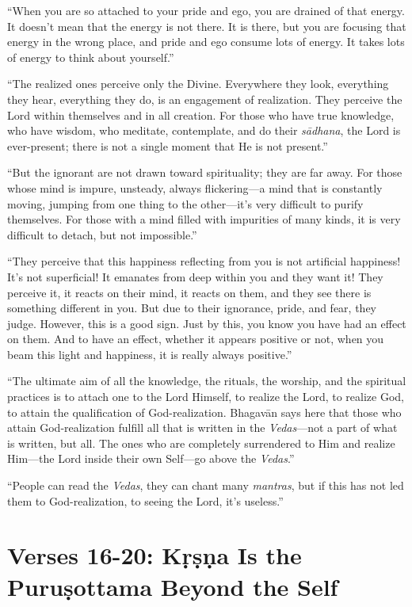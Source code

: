 \documentclass[12pt, twoside, openright]{memoir}
\begin{document}
\enquote{When you are so attached to your pride and ego, you are drained of that energy. It doesn’t mean that the energy is not there. It is there, but you are focusing that energy in the wrong place, and pride and ego consume lots of energy. It takes lots of energy to think about yourself.}

\enquote{The realized ones perceive only the Divine. Everywhere they look, everything they hear, everything they do, is an engagement of realization. They perceive the Lord within themselves and in all creation. For those who have true knowledge, who have wisdom, who meditate, contemplate, and do their \textit{sādhana}, the Lord is ever-present; there is not a single moment that He is not present.}

\enquote{But the ignorant are not drawn toward spirituality; they are far away. For those whose mind is impure, unsteady, always flickering---a mind that is constantly moving, jumping from one thing to the other---it’s very difficult to purify themselves. For those with a mind filled with impurities of many kinds, it is very difficult to detach, but not impossible.}

\enquote{They perceive that this happiness reflecting from you is not artificial happiness! It’s not superficial! It emanates from deep within you and they want it! They perceive it, it reacts on their mind, it reacts on them, and they see there is something different in you. But due to their ignorance, pride, and fear, they judge. However, this is a good sign. Just by this, you know you have had an effect on them. And to have an effect, whether it appears positive or not, when you beam this light and happiness, it is really always positive.}

\enquote{The ultimate aim of all the knowledge, the rituals, the worship, and the spiritual practices is to attach one to the Lord Himself, to realize the Lord, to realize God, to attain the qualification of God-realization. Bhagavān says here that those who attain God-realization fulfill all that is written in the \textit{Vedas}---not a part of what is written, but all. The ones who are completely surrendered to Him and realize Him---the Lord inside their own Self---go above the \textit{Vedas}.}

\enquote{People can read the \textit{Vedas}, they can chant many \textit{mantras}, but if this has not led them to God-realization, to seeing the Lord, it’s useless.}

\section{Verses 16-20: Kṛṣṇa Is the Puruṣottama Beyond the Self}\label{sec-verses-16-20-krsna-is-the-purusottama-beyond-the-self}
\end{document}
